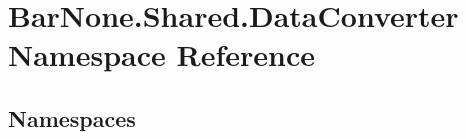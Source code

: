 \hypertarget{namespace_bar_none_1_1_shared_1_1_data_converter}{}\section{Bar\+None.\+Shared.\+Data\+Converter Namespace Reference}
\label{namespace_bar_none_1_1_shared_1_1_data_converter}
\subsection*{Namespaces}
\begin{DoxyCompactItemize}
\end{DoxyCompactItemize}
